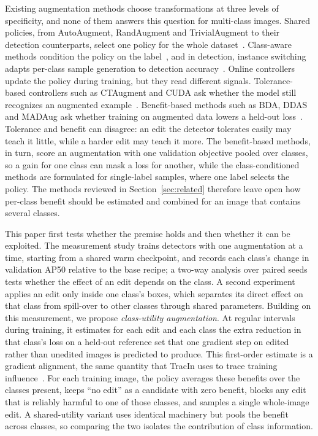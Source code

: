 \documentclass[conference]{IEEEtran}
\begin{document}
Existing augmentation methods choose transformations at three levels of specificity, and none of them answers this question for multi-class images. Shared policies, from AutoAugment, RandAugment and TrivialAugment to their detection counterparts, select one policy for the whole dataset~\cite{cubuk2019auto,cubuk2020rand,muller2021trivial,zoph2020det,chen2021scale}. Class-aware methods condition the policy on the label~\cite{cheung2022adaaug,yoo2023,ahn2023cuda}, and in detection, instance switching adapts per-class sample generation to detection accuracy~\cite{wang2019psis}. Online controllers update the policy during training, but they read different signals. Tolerance-based controllers such as CTAugment and CUDA ask whether the model still recognizes an augmented example~\cite{berthelot2020,ahn2023cuda}. Benefit-based methods such as BDA, DDAS and MADAug ask whether training on augmented data lowers a held-out loss~\cite{lu2023bda,liu2021ddas,hou2023madaug}. Tolerance and benefit can disagree: an edit the detector tolerates easily may teach it little, while a harder edit may teach it more. The benefit-based methods, in turn, score an augmentation with one validation objective pooled over classes, so a gain for one class can mask a loss for another, while the class-conditioned methods are formulated for single-label samples, where one label selects the policy. The methods reviewed in Section~\ref{sec:related} therefore leave open how per-class benefit should be estimated and combined for an image that contains several classes.

This paper first tests whether the premise holds and then whether it can be exploited. The measurement study trains detectors with one augmentation at a time, starting from a shared warm checkpoint, and records each class's change in validation AP50 relative to the base recipe; a two-way analysis over paired seeds tests whether the effect of an edit depends on the class. A second experiment applies an edit only inside one class's boxes, which separates its direct effect on that class from spill-over to other classes through shared parameters. Building on this measurement, we propose \emph{class-utility augmentation}. At regular intervals during training, it estimates for each edit and each class the extra reduction in that class's loss on a held-out reference set that one gradient step on edited rather than unedited images is predicted to produce. This first-order estimate is a gradient alignment, the same quantity that TracIn uses to trace training influence~\cite{pruthi2020tracin}. For each training image, the policy averages these benefits over the classes present, keeps ``no edit'' as a candidate with zero benefit, blocks any edit that is reliably harmful to one of those classes, and samples a single whole-image edit. A shared-utility variant uses identical machinery but pools the benefit across classes, so comparing the two isolates the contribution of class information.
\end{document}
